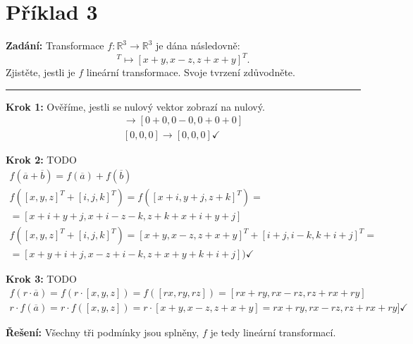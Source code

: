 \section{Příklad 3}
\textbf{Zadání:} Transformace $f: \mathbb{R}^3 \xrightarrow{} \mathbb{R}^3$ je dána následovně:
\begin{displaymath}
[x, y, z]^T \mapsto [x+y, x-z, z+x+y]^T.
\end{displaymath}
Zjistěte, jestli je $f$ lineární transformace. Svoje tvrzení zdůvodněte.
\par\noindent\rule{\textwidth}{0.4pt}

\textbf{Krok 1:} Ověříme, jestli se nulový vektor zobrazí na nulový.
\begin{gather*}
[0, 0, 0] \xrightarrow{} [0+0, 0-0, 0+0+0] \\
[0, 0, 0] \xrightarrow{} [0, 0, 0]  \checkmark
\end{gather*}

\textbf{Krok 2:} TODO
\begin{gather*}
f(\overline{a}+\overline{b}) = f(\overline{a}) + f(\overline{b})\\
f([x, y, z]^T+[i, j, k]^T) = f([x+i, y+j, z+k]^T) =\\= [x+i+y+j, x+i-z-k, z+k+x+i+y+j]\\
f([x, y, z]^T+[i, j, k]^T)=[x+y, x-z, z+x+y]^T+[i+j,i-k,k+i+j]^T =\\=[x+y+i+j, x-z+i-k, z+x+y+k+i+j])\checkmark
\end{gather*}

\textbf{Krok 3:} TODO
\begin{gather*}
f(r\cdot\overline{a}) = f(r\cdot[x,y,z])=f([rx, ry, rz]) = [rx+ry, rx-rz, rz+rx+ry]\\
r\cdot f(\overline{a})=r\cdot f([x,y,z])=r\cdot[x+y,x-z,z+x+y]=rx+ry,rx-rz,rz+rx+ry]\checkmark
\end{gather*}

\textbf{Řešení:} Všechny tři podmínky jsou splněny, $f$ je tedy lineární transformací.

